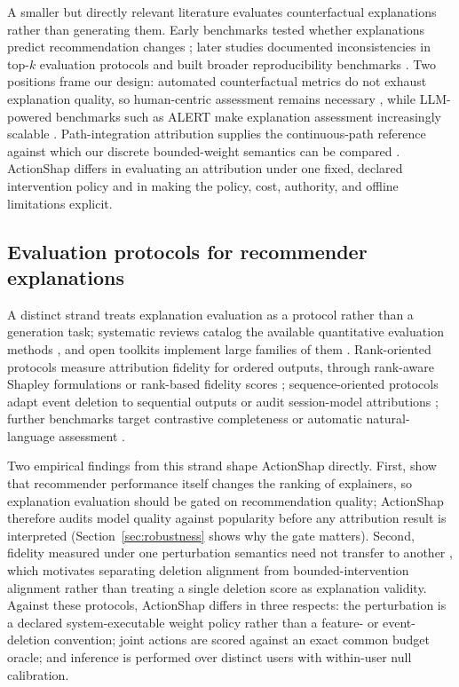 \documentclass[a4paper,fleqn,doubleblind]{cas-sc}
\begin{document}
A smaller but directly relevant literature evaluates counterfactual explanations rather than generating them. Early benchmarks tested whether explanations predict recommendation changes \citep{yao2022,baklanov2024}; later studies documented inconsistencies in top-$k$ evaluation protocols \citep{mohammadi2025} and built broader reproducibility benchmarks \citep{nguyen2026}. Two positions frame our design: automated counterfactual metrics do not exhaust explanation quality, so human-centric assessment remains necessary \citep{domnich2025unifying}, while LLM-powered benchmarks such as ALERT make explanation assessment increasingly scalable \citep{li2025alert}. Path-integration attribution supplies the continuous-path reference against which our discrete bounded-weight semantics can be compared \citep{sundararajan2017axiomatic}. ActionShap differs in evaluating an attribution under one fixed, declared intervention policy and in making the policy, cost, authority, and offline limitations explicit.

\subsection{Evaluation protocols for recommender explanations}
A distinct strand treats explanation evaluation as a protocol rather than a generation task; systematic reviews catalog the available quantitative evaluation methods \citep{nauta2023survey}, and open toolkits implement large families of them \citep{hedstrom2023quantus}. Rank-oriented protocols measure attribution fidelity for ordered outputs, through rank-aware Shapley formulations \citep{chowdhury2024rankshap} or rank-based fidelity scores \citep{pliatsika2025sharpl}; sequence-oriented protocols adapt event deletion to sequential outputs \citep{bento2021timeshap} or audit session-model attributions \citep{bruun2025session}; further benchmarks target contrastive completeness \citep{mousavi2023clime} or automatic natural-language assessment \citep{li2025alert}.

Two empirical findings from this strand shape ActionShap directly. First, \citet{mohammadi2024recsys} show that recommender performance itself changes the ranking of explainers, so explanation evaluation should be gated on recommendation quality; ActionShap therefore audits model quality against popularity before any attribution result is interpreted (Section~\ref{sec:robustness} shows why the gate matters). Second, fidelity measured under one perturbation semantics need not transfer to another \citep{baklanov2025fidelity,barkan2026spinrec}, which motivates separating deletion alignment from bounded-intervention alignment rather than treating a single deletion score as explanation validity. Against these protocols, ActionShap differs in three respects: the perturbation is a declared system-executable weight policy rather than a feature- or event-deletion convention; joint actions are scored against an exact common budget oracle; and inference is performed over distinct users with within-user null calibration.
\end{document}
